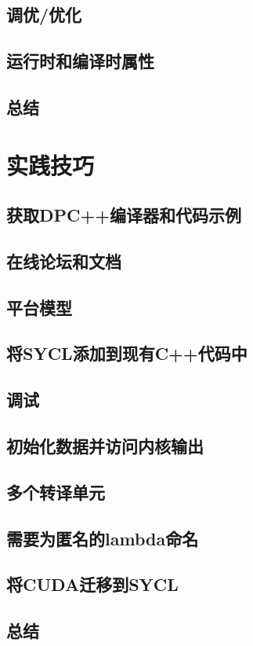 \documentclass[11pt,a4paper,UTF8]{ctexart}
\begin{document}
		\subsection{调优/优化}
		\subsection{运行时和编译时属性}
		\subsection{总结}
	\section{实践技巧}
		\subsection{获取DPC++编译器和代码示例}
		\subsection{在线论坛和文档}
		\subsection{平台模型}
		\subsection{将SYCL添加到现有C++代码中}
		\subsection{调试}
		\subsection{初始化数据并访问内核输出}
		\subsection{多个转译单元}
		\subsection{需要为匿名的lambda命名}
		\subsection{将CUDA迁移到SYCL}
		\subsection{总结}
\end{document}
